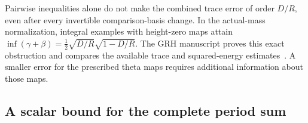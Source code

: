 Pairwise inequalities alone do not make the combined trace error of
order $D/R$, even after every invertible comparison-basis change.
In the actual-mass normalization, integral examples with height-zero maps attain
$\inf(\gamma+\beta)=\tfrac12\sqrt{D/R}\sqrt{1-D/R}$.
The GRH manuscript proves this exact obstruction and compares the
available trace and squared-energy estimates~\cite{rh-companion}.
A smaller error for the prescribed theta maps requires additional
information about those maps.

\subsection{A scalar bound for the complete period sum}



